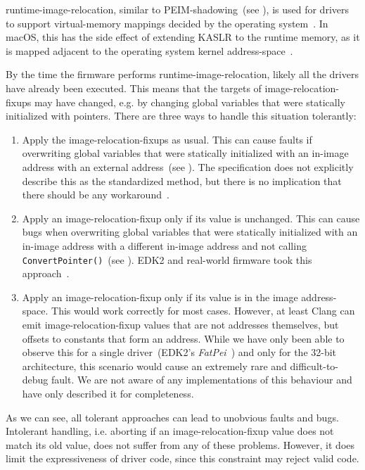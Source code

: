 \Gls{runtime-image-relocation}, similar to \gls{PEIM-shadowing}~(see ), is used for  drivers to support \gls{virtual-memory} mappings decided by the operating system~\cite{pi-spec}. In macOS, this has the side effect of extending \gls{KASLR} to the  runtime memory, as it is mapped adjacent to the operating system kernel \gls{address-space}~\cite{xnu}.

By the time the \gls{firmware} performs \gls{runtime-image-relocation}, likely all the  drivers have already been executed. This means that the targets of \glspl{image-relocation-fixup} may have changed, e.g. by changing global variables that were statically initialized with pointers. There are three ways to handle this situation tolerantly:
\begin{enumerate}
  \item Apply the \glspl{image-relocation-fixup} as usual. This can cause faults if overwriting global variables that were statically initialized with an in-\gls{image} address with an external address~(see ). The  specification does not explicitly describe this as the standardized method, but there is no implication that there should be any workaround~\cite{uefi-spec}.
  \item Apply an \gls{image-relocation-fixup} only if its value is unchanged. This can cause bugs when overwriting global variables that were statically initialized with an in-\gls{image} address with a different in-\gls{image} address and not calling \lstinline|ConvertPointer()|~(see ). \Gls{EDK2} and real-world \gls{firmware} took this approach~\cite{edk2}.
  \item Apply an \gls{image-relocation-fixup} only if its value is in the \gls{image} \gls{address-space}. This would work correctly for most cases. However, at least Clang can emit \gls{image-relocation-fixup} values that are not addresses themselves, but offsets to constants that form an address. While we have only been able to observe this for a single driver~(\gls{EDK2}'s \textit{FatPei}~\cite{edk2}) and only for the  32-bit architecture, this scenario would cause an extremely rare and difficult-to-debug fault. We are not aware of any implementations of this behaviour and have only described it for completeness.
\end{enumerate}

As we can see, all tolerant approaches can lead to unobvious faults and bugs. Intolerant handling, i.e. aborting if an \gls{image-relocation-fixup} value does not match its old value, does not suffer from any of these problems. However, it does limit the expressiveness of  driver code, since this constraint may reject valid  code.

